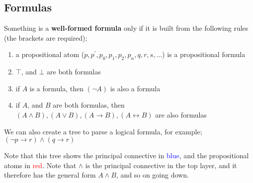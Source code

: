\documentclass[a4paper, 12pt]{article}
\begin{document}
        \subsection*{Formulas}
        Something is a \textbf{well-formed formula} only if it is built from the following rules (the brackets are required);
        \begin{enumerate}[1.]
            \item a propositional atom ($p, p^\prime, p_0, p_1, p_2, p_n, q, r, s, ...$) is a propositional formula
            \item $\top$, and $\bot$ are both formulas
            \item if $A$ is a formula, then $(\neg A)$ is also a formula
            \item if $A$, and $B$ are both formulas, then $(A \land B), (A \lor B), (A \rightarrow B), (A \leftrightarrow B)$ are also formulas
        \end{enumerate}
        We can also create a tree to parse a logical formula, for example; $(\neg p \rightarrow r) \land (q \rightarrow r)$

        \begin{center}
        \end{center}
        Note that this tree shows the principal connective in \textcolor{blue}{blue}, and the propositional atoms in \textcolor{red}{red}. Note that $\land$ is the principal connective in the top layer, and it therefore has the general form $A \land B$, and so on going down.
\end{document}
